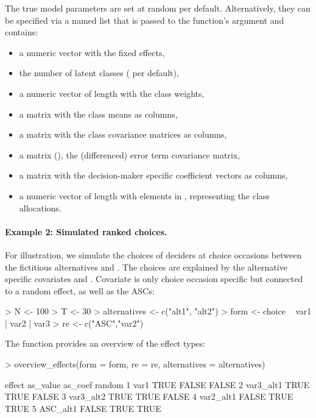 \documentclass[article,shortnames]{jss}
\newcommand{\fct}[1]{\code{#1()}}
\begin{document}
The true model parameters are set at random per default. Alternatively, they can be specified via a named list that is passed to the function's  argument and contains:
\begin{itemize}
  \item a numeric vector  with the fixed effects,
  \item the number  of latent classes ( per default),
  \item a numeric vector  of length  with the class weights,
  \item a matrix  with the class means as columns,
  \item a matrix  with the class covariance matrices as columns,
  \item a matrix  (), the (differenced) error term covariance matrix,
  \item a matrix  with the decision-maker specific coefficient vectors as columns,
  \item a numeric vector  of length  with elements in , representing the class allocations.
\end{itemize}

\paragraph{Example 2: Simulated ranked choices.} For illustration, we simulate the choices of  deciders at  choice occasions between the fictitious alternatives  and . The choices are explained by the alternative specific covariates  and . Covariate  is only choice occasion specific but connected to a random effect, as well as the ASCs:

\begin{Schunk}
\begin{Sinput}
> N <- 100
> T <- 30
> alternatives <- c("alt1", "alt2")
> form <- choice ~ var1 | var2 | var3
> re <- c("ASC","var2")
\end{Sinput}
\end{Schunk}

The \fct{overview\_effects} function provides an overview of the effect types:

\begin{Schunk}
\begin{Sinput}
> overview_effects(form = form, re = re, alternatives = alternatives)
\end{Sinput}
\begin{Soutput}
     effect as_value as_coef random
1      var1     TRUE   FALSE  FALSE
2 var3_alt1     TRUE    TRUE  FALSE
3 var3_alt2     TRUE    TRUE  FALSE
4 var2_alt1    FALSE    TRUE   TRUE
5  ASC_alt1    FALSE    TRUE   TRUE
\end{Soutput}
\end{Schunk}
\end{document}
